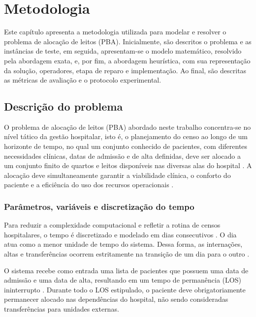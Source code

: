 \chapter{Metodologia}
\label{cap:metodologia}

Este capítulo apresenta a metodologia utilizada para modelar e resolver o problema de alocação de leitos (PBA). Inicialmente, são descritos o problema e as instâncias de teste, em seguida, apresentam-se o modelo matemático, resolvido pela abordagem exata, e, por fim, a abordagem heurística, com sua representação da solução, operadores, etapa de reparo e implementação. Ao final, são descritas as métricas de avaliação e o protocolo experimental.

\section{Descrição do problema}

O problema de alocação de leitos (PBA) abordado neste trabalho concentra-se no nível tático da gestão hospitalar, isto é, o planejamento do censo ao longo de um horizonte de tempo, no qual um conjunto conhecido de pacientes, com diferentes necessidades clínicas, datas de admissão e de alta definidas, deve ser alocado a um conjunto finito de quartos e leitos disponíveis nas diversas alas do hospital \cite{demeester2010hybrid}. A alocação deve simultaneamente garantir a viabilidade clínica, o conforto do paciente e a eficiência do uso dos recursos operacionais \cite{schafer2023combining}.

\subsection{Parâmetros, variáveis e discretização do tempo}

Para reduzir a complexidade computacional e refletir a rotina de censos hospitalares, o tempo é discretizado e modelado em dias consecutivos \cite{ceschia2012modeling, demeester2010hybrid}. O dia atua como a menor unidade de tempo do sistema. Dessa forma, as internações, altas e transferências ocorrem estritamente na transição de um dia para o outro \cite{demeester2010hybrid}.

O sistema recebe como entrada uma lista de pacientes que possuem uma data de admissão e uma data de alta, resultando em um tempo de permanência (LOS) ininterrupto \cite{ceschia2012modeling}. Durante todo o LOS estipulado, o paciente deve obrigatoriamente permanecer alocado nas dependências do hospital, não sendo consideradas transferências para unidades externas. 

